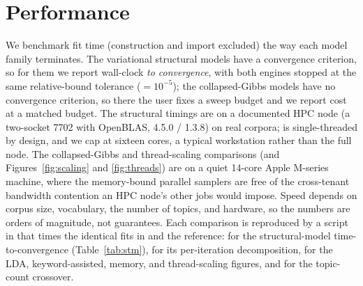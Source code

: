 \documentclass[article]{jss}
\begin{document}
\section{Performance}\label{sec:performance}

We benchmark fit time (construction and import excluded) the way each model family
terminates. The variational structural models have a convergence criterion, so for
them we report wall-clock \emph{to convergence},
with both engines stopped at the same relative-bound tolerance
($=10^{-5}$); the collapsed-Gibbs models have no convergence criterion,
so there the user fixes a sweep budget and we report cost at a matched budget. The
structural timings are on a documented HPC node (a two-socket 
 7702 with OpenBLAS,  4.5.0 /  1.3.8) on real
corpora;   is single-threaded by design, and we cap
 at sixteen cores, a typical workstation rather than the full node. The
collapsed-Gibbs and thread-scaling comparisons (and Figures~\ref{fig:scaling} and
\ref{fig:threads}) are on a quiet 14-core Apple M-series machine, where the
memory-bound parallel samplers are free of the cross-tenant bandwidth contention an
HPC node's other jobs would impose.
Speed depends on corpus size, vocabulary, the number of topics, and hardware, so
the numbers are orders of magnitude, not guarantees. Each comparison is reproduced
by a script in  that times the identical fits in  and
the reference:  for the structural-model
time-to-convergence (Table~\ref{tab:stm}),  for its
per-iteration decomposition,  for the LDA, keyword-assisted, memory,
and thread-scaling figures, and  for the 
topic-count crossover.
\end{document}
